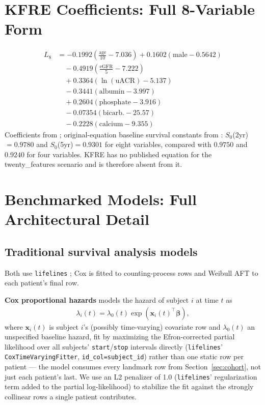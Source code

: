 \section{KFRE Coefficients: Full 8-Variable Form} \label{app:kfre}
\begin{align}
L_8 &= -0.1992\left(\tfrac{\text{age}}{10}-7.036\right) + 0.1602(\text{male}-0.5642) \nonumber \\
&\quad -0.4919\left(\tfrac{\text{eGFR}}{5}-7.222\right) \nonumber \\
&\quad + 0.3364\left(\ln(\text{uACR})-5.137\right) \nonumber \\
&\quad -0.3441(\text{albumin}-3.997) \nonumber \\
&\quad + 0.2604(\text{phosphate}-3.916) \nonumber \\
&\quad -0.07354(\text{bicarb.}-25.57) \nonumber \\
&\quad -0.2228(\text{calcium}-9.355)
\end{align}
Coefficients from \citet{tangri2011predicting}; original-equation baseline survival constants from \citet{tangri2016multinational}: $S_0$(2yr)$=0.9780$ and $S_0$(5yr)$=0.9301$ for eight variables, compared with $0.9750$ and $0.9240$ for four variables. KFRE has no published equation for the twenty\_features scenario and is therefore absent from it.

\section{Benchmarked Models: Full Architectural Detail} \label{app:models}

\subsection{Traditional survival analysis models}
Both use \texttt{lifelines} \citep{davidson2019lifelines}; Cox is fitted to counting-process rows and Weibull AFT to each patient's final row.

\textbf{Cox proportional hazards} \citep{cox1972regression} models the hazard of subject $i$ at time $t$ as
\begin{align}
\lambda_i(t) = \lambda_0(t)\exp(\boldsymbol{x}_i(t)^\intercal\boldsymbol{\beta}),
\end{align}
where $\boldsymbol{x}_i(t)$ is subject $i$'s (possibly time-varying) covariate row and $\lambda_0(t)$ an unspecified baseline hazard, fit by maximizing the Efron-corrected partial likelihood over all subjects' \texttt{start}/\texttt{stop} intervals directly (\texttt{lifelines}' \texttt{CoxTimeVaryingFitter}, \texttt{id\_col=subject\_id}) rather than one static row per patient — the model consumes every landmark row from Section~\ref{sec:cohort}, not just each patient's last. We use an L2 penalizer of 1.0 (\texttt{lifelines}' regularization term added to the partial log-likelihood) to stabilize the fit against the strongly collinear rows a single patient contributes.

